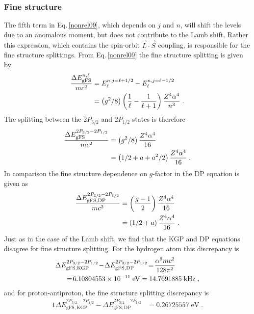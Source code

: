 \subsubsection{Fine structure} \label{fs}
The fifth term in Eq.\,\eqref{nonrel09}, which depends on $j$ and $n$, will shift the levels due to an anomalous moment, but does not contribute to the Lamb shift. Rather this expression, which contains the spin-orbit $\vec{L}\cdot\vec{S}$ coupling, is responsible for the fine structure splittings. From Eq.\,\eqref{nonrel09} the fine structure splitting is given by
\begin{alignat}{1}
\label{fs00} \frac{\Delta E_{\mathrm{gFS}}^{n,\ell}}{mc^{2}}&=E^{n,j=\ell+1/2}_{\ell}-E^{n,j=\ell-1/2}_{\ell}\\ \notag &=\left(g^{2}/8\right)\left(\frac{1}{\ell}-\frac{1}{\ell+1}\right)\frac{Z^{4}\alpha^{4}}{n^{3}}\;.
\end{alignat}
The splitting between the $2P_{3/2}$ and $2P_{1/2}$ states is therefore
\begin{alignat}{1}
\label{fs01} \frac{\Delta E_{\mathrm{gFS}}^{2P_{3/2}-2P_{1/2}}}{mc^{2}}&=\left(g^{2}/8\right)\frac{Z^{4}\alpha^{4}}{16}\\ \notag\ &=\left(1/2+a+a^{2}/2\right)\frac{Z^{4}\alpha^{4}}{16}\;.
\end{alignat}
In comparison the fine structure dependence on $g$-factor in the DP equation is given as
\begin{alignat}{1}
\label{fs02} \frac{\Delta E_{\mathrm{gFS,DP}}^{2P_{3/2}-2P_{1/2}}}{mc^{2}}&=\left(\frac{g-1}{2}\right)\frac{Z^{4}\alpha^{4}}{16}\\ \notag\ &=\left(1/2+a\right)\frac{Z^{4}\alpha^{4}}{16}\;.
\end{alignat}
Just as in the case of the Lamb shift, we find that the KGP and DP equations disagree for fine structure splitting. For the hydrogen atom this discrepancy is 
\begin{alignat}{1}
\label{fs03} \Delta &E_{\mathrm{gFS,KGP}}^{2P_{3/2}-2P_{1/2}}\!-\!\Delta E_{\mathrm{gFS,DP}}^{2P_{3/2}-2P_{1/2}}\!=\!\frac{\alpha^{6}mc^{2}}{128\pi^{2}}\\ \notag&\;\;=\!6.10804553\times10^{-11}\;\mathrm{eV}=14.7691885\;\mathrm{kHz}\;,\end{alignat}
and for proton-antiproton, the fine structure splitting discrepancy is
\begin{alignat}{1}
\label{fs04} \Delta E_{\mathrm{gFS,KGP}}^{2P_{3/2}-2P_{1/2}}-\Delta E_{\mathrm{gFS,DP}}^{2P_{3/2}-2P_{1/2}}&=0.26725557\;\mathrm{eV}\;.
\end{alignat}
